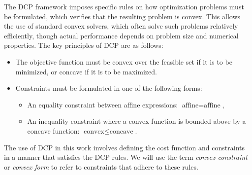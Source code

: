 The DCP framework imposes specific rules on how optimization problems must be formulated, which verifies that the resulting problem is convex.
This allows the use of standard convex solvers, which often solve such problems relatively efficiently, though actual performance depends on problem
size and numerical properties.
The key principles of DCP are as follows:
\begin{itemize}
	\item The objective function must be convex over the feasible set if it is to be minimized, or concave if it is to
	      be maximized.
	\item Constraints must be formulated in one of the following forms:
	      \begin{itemize}
		      \item An equality constraint between affine expressions: \(\text{affine} = \text{affine}\),
		      \item An inequality constraint where a convex function is bounded above by a concave function: \(\text{convex} \leq \text{concave}\).
	      \end{itemize}
\end{itemize}
The use of DCP in this work involves defining the cost function and constraints in a manner that satisfies the DCP rules.
We will use the term \textit{convex constraint} or \textit{convex form} to refer to constraints that adhere to these rules.
